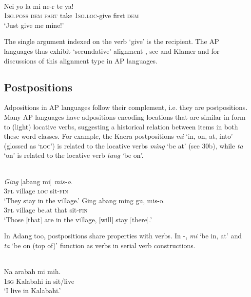 {\ea%
\label{ex:1:29}
   \\
\gll Nei  yo  la  mi  ne-r  te  ya! \\
\textsc{1sg.poss}  \textsc{dem}  \textsc{part} take  1\textsc{sg.loc}{}-give  first  \textsc{dem}    \\
\glt `Just give me mine!' 
\z
 
The single argument indexed on the verb `give' is the recipient. The AP languages thus exhibit `secundative' alignment \citep{Dryer1986}, see \citet{Klamer2010ditransitive} and Klamer and \citet{Schapper2012} for discussions of this alignment type in AP languages.

\subsection{Postpositions}\label{sec:1:5.6}
Adpositions in AP languages follow their complement, i.e. they are postpositions. Many AP languages have adpositions encoding locations that are similar in form to (light) locative verbs, suggesting a historical relation between items in both these word classes. For example, the Kaera postpositions \textit{mi} `in, on, at, into' (glossed as `\textsc{loc')}  is related to the locative verbs \textit{ming} `be at' (see 30b), while \textit{ta} `on' is related to the locative verb \textit{tang} `be on'. 



\ea%
\label{ex:1:30}
\ea
{}\\
\gll \textit{Ging} [abang  mi]  \textit{mis-o.}  \\
  \textsc{3pl} village  \textsc{loc} sit-\textsc{fin}  \\
\glt `They stay in the village.' 
\ex
\gll Ging  abang   ming  gu,   mis-o. \\
\textsc{3pl} village  be.at  that  sit-\textsc{fin}   \\
\glt `Those [that] are in the village, [will] stay [there].'
\z\z
 
 


In Adang too, postpositions share properties with verbs. In -, \textit{mi} `be in, at' and \textit{ta} `be on (top of)' function as verbs in serial verb constructions. 



\ea%
\label{ex:1:31}
\\
\gll Na  {\textglotstop}arabah  mi  mih. \\
\textsc{1sg} Kalabahi  in   sit/live      \\
\glt `I live in Kalabahi.' 
\z
 

}
